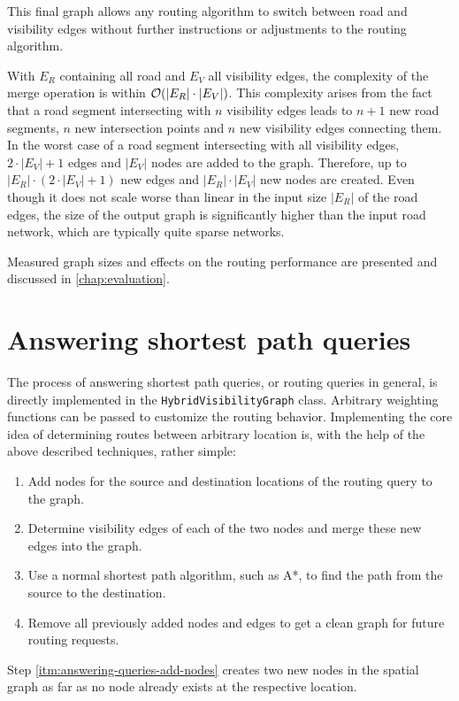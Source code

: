 		This final graph allows any routing algorithm to switch between road and visibility edges without further instructions or adjustments to the routing algorithm.
		

		With $E_R$ containing all road and $E_V$ all visibility edges, the complexity of the merge operation is within $\mathcal{O}(|E_R| \cdot |E_V|)$.
		This complexity arises from the fact that a road segment intersecting with $n$ visibility edges leads to $n+1$ new road segments, $n$ new intersection points and $n$ new visibility edges connecting them.
		In the worst case of a road segment intersecting with all visibility edges, $2 \cdot |E_V| + 1$ edges and $|E_V|$ nodes are added to the graph.
		Therefore, up to $|E_R| \cdot (2 \cdot |E_V| + 1)$ new edges and $|E_R| \cdot |E_V|$ new nodes are created.
		Even though it does not scale worse than linear in the input size $|E_R|$ of the road edges, the size of the output graph is significantly higher than the input road network, which are typically quite sparse networks.

		Measured graph sizes and effects on the routing performance are presented and discussed in \cref{chap:evaluation}.
	
\section{Answering shortest path queries}
\label{sec:answering-queries}

	The process of answering shortest path queries, or routing queries in general, is directly implemented in the \texttt{HybridVisibilityGraph} class.
	Arbitrary weighting functions can be passed to customize the routing behavior.
	Implementing the core idea of determining routes between arbitrary location is, with the help of the above described techniques, rather simple:
	\begin{enumerate}
		\item \label{itm:answering-queries-add-nodes} Add nodes for the source and destination locations of the routing query to the graph.
		\item \label{itm:answering-queries-vis-edges} Determine visibility edges of each of the two nodes and merge these new edges into the graph.
		\item \label{itm:answering-queries-routing} Use a normal shortest path algorithm, such as A*, to find the path from the source to the destination.
		\item \label{itm:answering-queries-cleanup} Remove all previously added nodes and edges to get a clean graph for future routing requests.
	\end{enumerate}
	Step \ref{itm:answering-queries-add-nodes} creates two new nodes in the spatial graph as far as no node already exists at the respective location.
	
